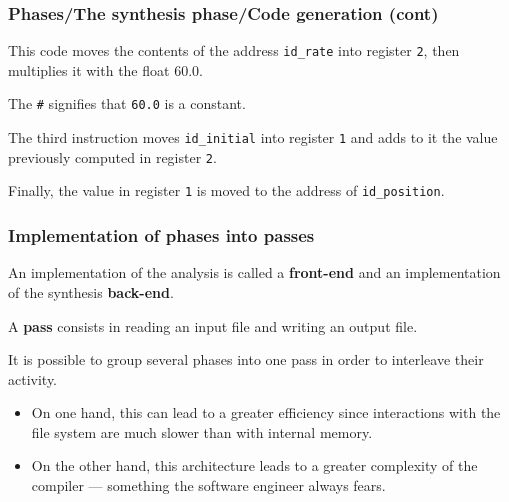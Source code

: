 % 
\begin{frame}
\frametitle{Phases/The synthesis phase/Code generation (cont)}

This code moves the contents of the address \texttt{id\_rate} into
register \texttt{2}, then multiplies it with the float 60.0.

\bigskip

The \texttt{\#} signifies that \texttt{60.0} is a constant. 

\bigskip

The third instruction moves \texttt{id\_initial} into register
\texttt{1} and adds to it the value previously computed in register
\texttt{2}.

\bigskip

Finally, the value in register \texttt{1} is moved to the address of
\texttt{id\_position}.

\end{frame}

% 
\begin{frame}
\frametitle{Implementation of phases into passes}

An implementation of the analysis is called a \textbf{front-end} and
an implementation of the synthesis \textbf{back-end}.

\bigskip

A \textbf{pass} consists in reading an input file and writing an output
file. 

\bigskip

It is possible to group several phases into one pass in order to
interleave their activity.
\begin{itemize}

  \item On one hand, this can lead to a greater efficiency since
  interactions with the file system are much slower than with internal
  memory. 

  \item On the other hand, this architecture leads to a greater
  complexity of the compiler --- something the software engineer
  always fears.

\end{itemize}

\end{frame}

